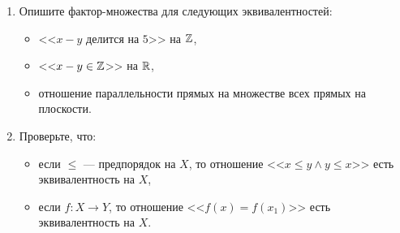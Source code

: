     \begin{problem}[5]
        \begin{enumerate}[label=(\alph{*})]
            \item Опишите фактор-множества для следующих эквивалентностей:
            \begin{itemize}
                \item <<\(x - y\) делится на \(5\)>> на \(\mathbb{Z}\),
                \item <<\(x - y \in \mathbb{Z}\)>> на \(\mathbb{R}\),
                \item отношение параллельности прямых на множестве всех прямых на плоскости.
            \end{itemize}
            \item Проверьте, что:
            \begin{itemize}
                \item если \(\leqslant\) --- предпорядок на \(X\), то отношение <<\(x \leqslant y \land y \leqslant x\)>> есть эквивалентность на \(X\),
                \item если \(f \colon X \to Y \), то отношение <<\(f(x) = f(x_1)\)>> есть эквивалентность на \(X\).
            \end{itemize}
        \end{enumerate}
    \end{problem}
